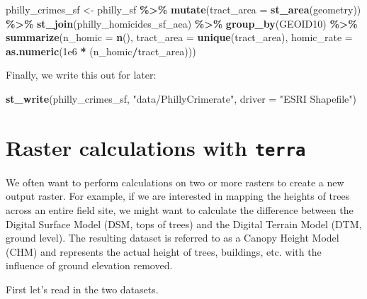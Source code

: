 \documentclass[
]{book}
\newenvironment{Shaded}{\begin{snugshade}}{\end{snugshade}}
\newcommand{\AttributeTok}[1]{\textcolor[rgb]{0.13,0.29,0.53}{#1}}
\newcommand{\FloatTok}[1]{\textcolor[rgb]{0.00,0.00,0.81}{#1}}
\newcommand{\FunctionTok}[1]{\textcolor[rgb]{0.13,0.29,0.53}{\textbf{#1}}}
\newcommand{\NormalTok}[1]{#1}
\newcommand{\OtherTok}[1]{\textcolor[rgb]{0.56,0.35,0.01}{#1}}
\newcommand{\SpecialCharTok}[1]{\textcolor[rgb]{0.81,0.36,0.00}{\textbf{#1}}}
\newcommand{\StringTok}[1]{\textcolor[rgb]{0.31,0.60,0.02}{#1}}
\begin{document}
\begin{Shaded}
\begin{Highlighting}[]
\NormalTok{philly\_crimes\_sf }\OtherTok{\textless{}{-}}\NormalTok{ philly\_sf }\SpecialCharTok{\%\textgreater{}\%}
      \FunctionTok{mutate}\NormalTok{(}\AttributeTok{tract\_area =} \FunctionTok{st\_area}\NormalTok{(geometry)) }\SpecialCharTok{\%\textgreater{}\%}
      \FunctionTok{st\_join}\NormalTok{(philly\_homicides\_sf\_aea) }\SpecialCharTok{\%\textgreater{}\%}
      \FunctionTok{group\_by}\NormalTok{(GEOID10) }\SpecialCharTok{\%\textgreater{}\%}
      \FunctionTok{summarize}\NormalTok{(}\AttributeTok{n\_homic =} \FunctionTok{n}\NormalTok{(),}
                \AttributeTok{tract\_area =} \FunctionTok{unique}\NormalTok{(tract\_area),}
                \AttributeTok{homic\_rate =} \FunctionTok{as.numeric}\NormalTok{(}\FloatTok{1e6} \SpecialCharTok{*}\NormalTok{ (n\_homic}\SpecialCharTok{/}\NormalTok{tract\_area))) }
\end{Highlighting}
\end{Shaded}

Finally, we write this out for later:

\begin{Shaded}
\begin{Highlighting}[]
\FunctionTok{st\_write}\NormalTok{(philly\_crimes\_sf, }\StringTok{"data/PhillyCrimerate"}\NormalTok{, }\AttributeTok{driver =} \StringTok{"ESRI Shapefile"}\NormalTok{)}
\end{Highlighting}
\end{Shaded}

\hypertarget{raster-calculations-with-terra}{%
\section{\texorpdfstring{Raster calculations with \texttt{terra}}{Raster calculations with terra}}\label{raster-calculations-with-terra}}

We often want to perform calculations on two or more rasters to create a new output raster. For example, if we are interested in mapping the heights of trees across an entire field site, we might want to calculate the difference between the Digital Surface Model (DSM, tops of trees) and the Digital Terrain Model (DTM, ground level). The resulting dataset is referred to as a Canopy Height Model (CHM) and represents the actual height of trees, buildings, etc. with the influence of ground elevation removed.

First let's read in the two datasets.
\end{document}
